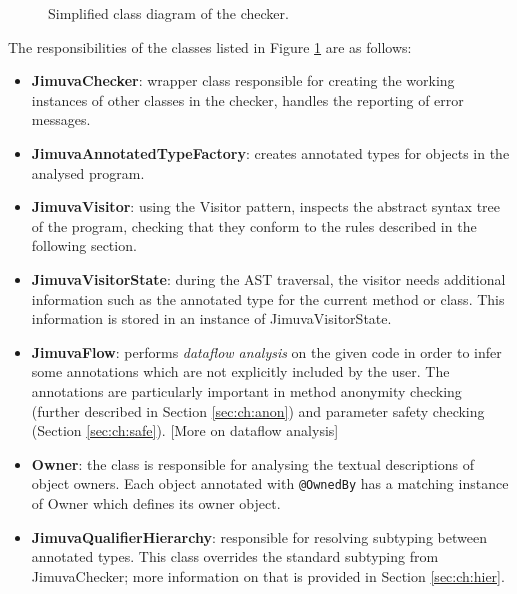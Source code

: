 \documentclass{pracamgr}
\theoremstyle{all}
\newcommand{\todo}[1]{{\color{red} [#1] }}
\begin{document}
\begin{figure}[p]
  \caption{Simplified class diagram of the checker.}
  \label{fig:classes}
\end{figure}

The responsibilities of the classes listed in Figure \ref{fig:classes}
are as follows:
\begin{itemize}
\item \textbf{JimuvaChecker}: wrapper class responsible for creating
  the working instances of other classes in the checker, handles the
  reporting of error messages.
\item \textbf{JimuvaAnnotatedTypeFactory}: creates annotated types for
  objects in the analysed program. 
\item \textbf{JimuvaVisitor}: using the Visitor pattern, inspects the
  abstract syntax tree of the program, checking that they conform to
  the rules described in the following section. 
\item \textbf{JimuvaVisitorState}: during the AST traversal, the
  visitor needs additional information such as the annotated type for
  the current method or class. This information is stored in an
  instance of JimuvaVisitorState. 
\item \textbf{JimuvaFlow}: performs \emph{dataflow analysis} on the
  given code in order to infer some annotations which are not
  explicitly included by the user. The annotations are particularly
  important in method anonymity checking (further described in Section
  \ref{sec:ch:anon}) and parameter safety checking (Section
  \ref{sec:ch:safe}). \todo{More on dataflow analysis}
\item \textbf{Owner}: the class is responsible for analysing the
  textual descriptions of object owners. Each object annotated with
  \texttt{@OwnedBy} has a matching instance of Owner which defines its
  owner object.
\item \textbf{JimuvaQualifierHierarchy}: responsible for resolving
  subtyping between annotated types. This class overrides the standard
  subtyping from JimuvaChecker; more information on that is provided
  in Section \ref{sec:ch:hier}. 
\end{itemize}
\end{document}
